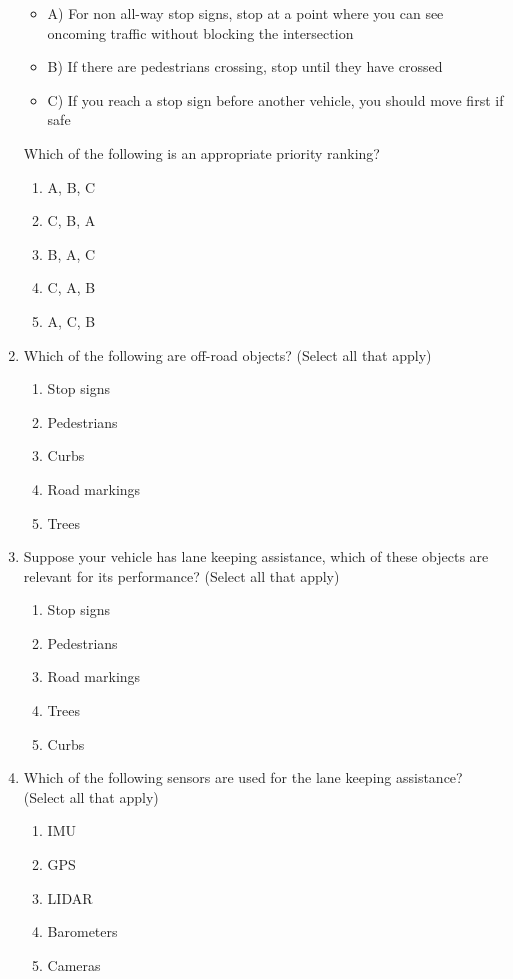 \begin{enumerate}
\begin{itemize}
\item A) For non all-way stop signs, stop at a point where you can see oncoming traffic without blocking the intersection
\item B) If there are pedestrians crossing, stop until they have crossed
\item C) If you reach a stop sign before another vehicle, you should move first if safe
\end{itemize}

Which of the following is an appropriate priority ranking?

\begin{enumerate}
\item A, B, C
\item C, B, A
\item B, A, C
\item C, A, B
\item A, C, B
\end{enumerate}

\item Which of the following are off-road objects? (Select all that apply) 

\begin{enumerate}
\item Stop signs
\item Pedestrians
\item Curbs
\item Road markings
\item Trees
\end{enumerate} 

\item Suppose your vehicle has lane keeping assistance, which of these objects are relevant for its performance? (Select all that apply)

\begin{enumerate}
\item Stop signs
\item Pedestrians
\item Road markings
\item Trees
\item Curbs
\end{enumerate}

\item Which of the following sensors are used for the lane keeping assistance? (Select all that apply)

\begin{enumerate}
\item IMU
\item GPS
\item LIDAR
\item Barometers
\item Cameras
\end{enumerate}


\end{enumerate}

